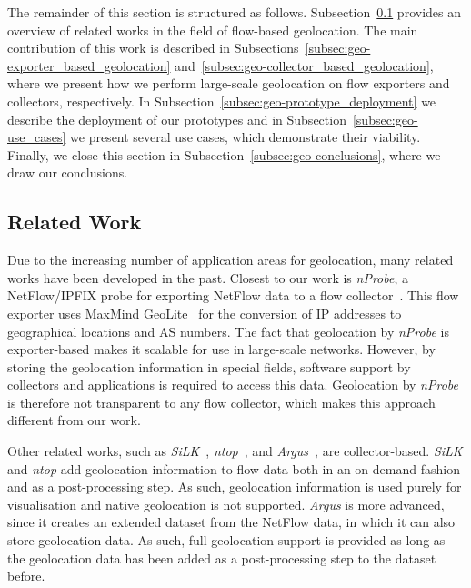 The remainder of this section is structured as follows. Subsection~\ref{subsec:geo-related_work} provides an overview of related works in the field of flow-based geolocation. The main contribution of this work is described in Subsections~\ref{subsec:geo-exporter_based_geolocation} and~\ref{subsec:geo-collector_based_geolocation}, where we present how we perform large-scale geolocation on flow exporters and collectors, respectively. In Subsection~\ref{subsec:geo-prototype_deployment} we describe the deployment of our prototypes and in Subsection~\ref{subsec:geo-use_cases} we present several use cases, which demonstrate their viability. Finally, we close this section in Subsection~\ref{subsec:geo-conclusions}, where we draw our conclusions.

\subsection{Related Work} \label{subsec:geo-related_work}

Due to the increasing number of application areas for geolocation, many related works have been developed in the past. Closest to our work is \textit{nProbe}, a NetFlow/IPFIX probe for exporting NetFlow data to a flow collector~\cite{--nProbe}. This flow exporter uses MaxMind GeoLite~\cite{MaxMind--GeoLite} for the conversion of IP addresses to geographical locations and AS numbers. The fact that geolocation by \textit{nProbe} is exporter-based makes it scalable for use in large-scale networks. However, by storing the geolocation information in special fields, software support by collectors and applications is required to access this data. Geolocation by \textit{nProbe} is therefore not transparent to any flow collector, which makes this approach different from our work.

Other related works, such as \textit{SiLK}~\cite{CERTNSAT--SiLK}, \textit{ntop}~\cite{--ntop}, and \textit{Argus}~\cite{QoSient--ARGUS}, are collector-based. \textit{SiLK} and \textit{ntop} add geolocation information to flow data both in an on-demand fashion and as a post-processing step. As such, geolocation information is used purely for visualisation and native geolocation is not supported. \textit{Argus} is more advanced, since it creates an extended dataset from the NetFlow data, in which it can also store geolocation data. As such, full geolocation support is provided as long as the geolocation data has been added as a post-processing step to the dataset before.

